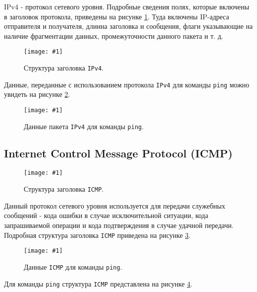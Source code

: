 \documentclass[12pt, a4paper]{article}
\newcommand{\figc}[4]{
  \begin{figure}[h]
  \begin{center}
    \texttt{[image: \#1]}
    \caption{#2}
    \label{fig:#3}
  \end{center}
  \end{figure}
}
\begin{document}
IPv4 - протокол сетевого уровня. Подробные сведения полях, которые включены в заголовок
протокола, приведены на рисунке \ref{fig:ipv4_h}. Туда включены IP-адреса
отправителя и получателя, длинна заголовка и сообщения, флаги указывающие на
наличие фрагментации данных, промежуточности данного пакета и т. д.

\figc{ipv4_header}{Структура заголовка \texttt{IPv4}.}{ipv4_h}{1.4}

Данные, переданные с использованием протокола \texttt{IPv4} для команды
\texttt{ping} можно увидеть на рисунке \ref{fig:p_ip}.

\newpage

\figc{ping_ipv4}{Данные пакета \texttt{IPv4} для команды \texttt{ping}.}{p_ip}{3.0}

\subsection{Internet Control Message Protocol (ICMP)}

\figc{icmp_header}{Структура заголовка \texttt{ICMP}.}{icmp_h}{1.4}

Данный протокол сетевого уровня используется для передачи служебных сообщений -
кода ошибки в случае исключительной ситуации, кода запрашиваемой операции и
кода подтверждения в случае удачной передачи. Подробная структура заголовка
\texttt{ICMP} приведена на рисунке \ref{fig:icmp_h}.

\figc{ping_icmp}{Данные \texttt{ICMP} для команды \texttt{ping}.}{ping_icmp}{3.0}

Для команды \texttt{ping} структура \texttt{ICMP} представлена на рисунке
\ref{fig:ping_icmp}.
\end{document}
